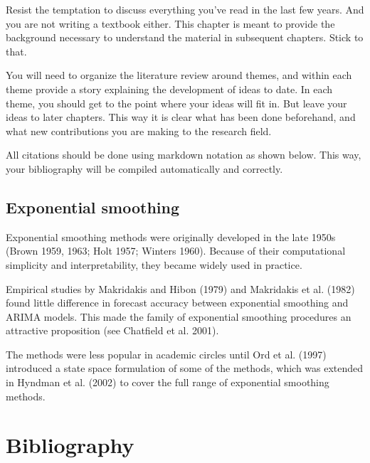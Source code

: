 \documentclass[
  11pt,
  a4paper,
  nottoc]{report}
\begin{document}
Resist the temptation to discuss everything you've read in the last few
years. And you are not writing a textbook either. This chapter is meant
to provide the background necessary to understand the material in
subsequent chapters. Stick to that.

You will need to organize the literature review around themes, and
within each theme provide a story explaining the development of ideas to
date. In each theme, you should get to the point where your ideas will
fit in. But leave your ideas to later chapters. This way it is clear
what has been done beforehand, and what new contributions you are making
to the research field.

All citations should be done using markdown notation as shown below.
This way, your bibliography will be compiled automatically and
correctly.

\section{Exponential smoothing}\label{sec-expsmooth}

Exponential smoothing methods were originally developed in the late
1950s (Brown 1959, 1963; Holt 1957; Winters 1960). Because of their
computational simplicity and interpretability, they became widely used
in practice.

Empirical studies by Makridakis and Hibon (1979) and Makridakis et al.
(1982) found little difference in forecast accuracy between exponential
smoothing and ARIMA models. This made the family of exponential
smoothing procedures an attractive proposition (see Chatfield et al.
2001).

The methods were less popular in academic circles until Ord et al.
(1997) introduced a state space formulation of some of the methods,
which was extended in Hyndman et al. (2002) to cover the full range of
exponential smoothing methods.


\chapter*{Bibliography}\label{bibliography}

\end{document}
